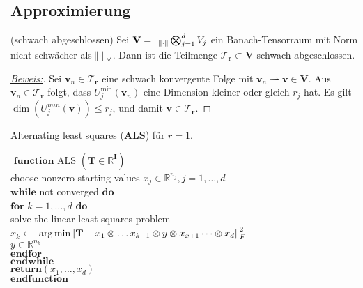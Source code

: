\documentclass[11pt]{article} %
\begin{document}
\subsection{Approximierung}
\begin{changemargin}{0pt}{0pt}

\begin{lemma} (schwach abgeschlossen)
Sei $\mathbf{V} = \hspace{2mm}_{\norm{\cdot}}\bigotimes^{d}_{j=1} V_{j}$ ein Banach-Tensorraum mit Norm nicht schwächer als $\norm{\cdot}_{\vee}$. Dann ist die Teilmenge $\mathcal{T}_{\mathbf{r}} \subset \mathbf{V}$ schwach abgeschlossen.
\end{lemma}
\begin{proof}[\underline{Beweis:}\nopunct]
Sei $\mathbf{v}_{n} \in \mathcal{T}_\mathbf{r}$ eine schwach konvergente Folge mit $\mathbf{v}_{n} \rightharpoonup \mathbf{v} \in \mathbf{V}$.
Aus $\mathbf{v}_{n} \in \mathcal{T}_\mathbf{r}$ folgt, dass $U^{\min}_{j}(\mathbf{v}_{n})$ eine Dimension kleiner oder gleich $r_{j}$ hat.
Es gilt $\dim(U^{min}_{j}(\mathbf{v}))\leq r_{j}$, und damit $\mathbf{v} \in \mathcal{T}_{\mathbf{r}}$.
\end{proof}

\begin{alg}
Alternating least squares ($\mathbf{ALS}$) für $r = 1$. \cite{tucker_tensorsketch}
\begin{tabbing}
\hspace*{5mm}\=\hspace*{5mm}\=\hspace*{5mm}\=\hspace{5mm}\=\hspace{1cm}\= \kill
$\mathbf{function }$ ALS \hspace{1mm} $(\mathbf{T} \in \mathbb{R}^{\mathbf{I}})$\\
\> choose nonzero starting values $x_{j} \in \mathbb{R}^{n_{j}}, j= 1,\dots,d$\\
\> $\mathbf{while}$ not converged $\mathbf{do}$\\
\> \> $\mathbf{for}$ \hspace{2mm} $k = 1,\dots,d$ \hspace{2mm} $\mathbf{do}$\\
\> \> \>solve the linear least squares problem\\
\> \> \> \> $x_{k} \leftarrow$ \> $\arg \min \norm{\mathbf{T} - x_{1}\otimes\dots x_{k-1}\otimes y \otimes x_{x+1} \dots
\otimes x_{d}}^{2}_{F}$\\
\> \> \> \> \> $y \in \mathbb{R}^{n_{k}}$\\
\> \> $\mathbf{end for}$\\
\> $\mathbf{end while}$\\
\> $\mathbf{return } (x_{1},\dots,x_{d})$\\
$\mathbf{end function}$
\end{tabbing}
\end{alg}

\end{changemargin}
\end{document}
